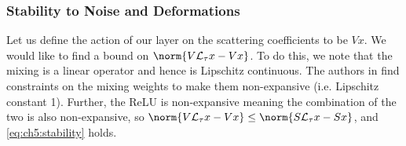 \subsubsection{Stability to Noise and Deformations}
Let us define the action of our layer on the scattering
coefficients to be $Vx$. We would like to find a bound on $\norm{V\mathcal{L}_\tau x -
V x}$. To do this, we note that the mixing is a linear operator and hence is
Lipschitz continuous. The authors in \cite{qiu_dcfnet:_2018} find constraints on the mixing
weights to make them non-expansive (i.e. Lipschitz constant 1).
Further, the ReLU is non-expansive meaning the combination of the two is
also non-expansive, so $\norm{V\mathcal{L}_\tau x - V x} \leq \norm{S\mathcal{L}_\tau
x - Sx}$, and \autoref{eq:ch5:stability} holds.


